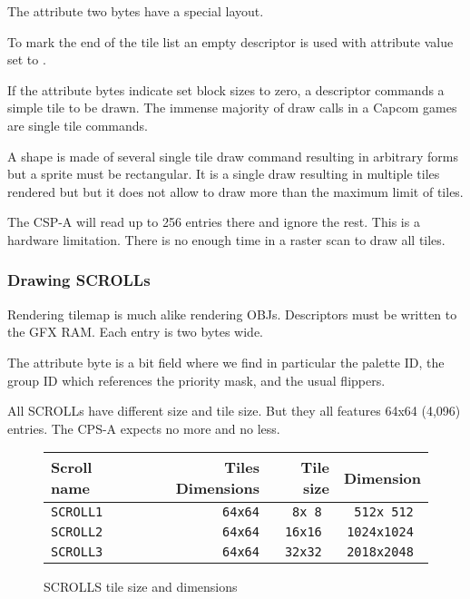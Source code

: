  

The attribute two bytes have a special layout.

 

To mark the end of the tile list an empty descriptor is used with attribute value set to . 

If the attribute bytes indicate set block sizes to zero, a descriptor commands a simple tile to be drawn. The immense majority of draw calls in a Capcom games are single tile commands.

A shape is made of several single tile draw command resulting in arbitrary forms but a sprite must be rectangular. It is a single draw resulting in multiple tiles rendered but but it does not allow to draw more than the maximum limit of tiles.

The CSP-A will read up to 256 entries there and ignore the rest. This is a hardware limitation. There is no enough time in a raster scan to draw all tiles.


\subsubsection{Drawing SCROLLs}

Rendering tilemap is much alike rendering OBJs. Descriptors must be written to the GFX RAM. Each entry is two bytes wide.

 

The attribute byte is a bit field where we find in particular the palette ID, the group ID which references the priority mask, and the usual flippers.

 

All SCROLLs have different size and tile size. But they all features 64x64 (4,096) entries. The CPS-A expects no more and no less. 


 \begin{figure}[H]
\begin{tabularx}{\textwidth}{Xrrr}
  \toprule    
  \textbf{Scroll name } & \textbf{ Tiles Dimensions } & \textbf{ Tile size }  & \textbf{Dimension }\\  
  \toprule   
    
\texttt{SCROLL1} & \texttt{64x64} & \texttt{8x 8 } &  \texttt{512x 512 }  \\  
\texttt{SCROLL2} & \texttt{64x64} & \texttt{16x16 } &  \texttt{1024x1024 }   \\  
\texttt{SCROLL3} & \texttt{64x64} & \texttt{32x32 } &  \texttt{2018x2048 }   \\  
  \toprule   
\end{tabularx}
\caption*{SCROLLS tile size and dimensions}
\end{figure}

